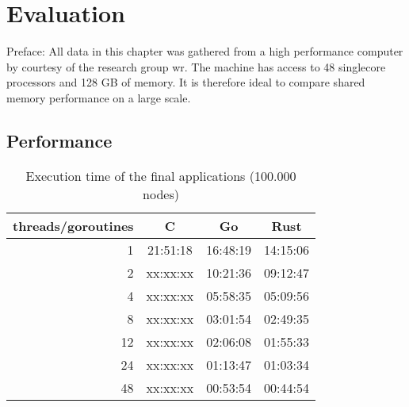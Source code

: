\chapter{Evaluation}
\label{ch:Evaluation}


Preface: All data in this chapter was gathered from a high performance computer by courtesy of the research group \gls{wr}. The machine has access to 48 singlecore processors and 128 GB of memory. It is therefore ideal to compare shared memory performance on a large scale.

\section{Performance}
\label{sec:Evaluaton::Performance}

\begin{table}[htb]
    \centering
    \begin{tabular}{rccc}
        \toprule
            threads/goroutines
            & C
            & Go
            & Rust \\
        \midrule

            1
            & 21:51:18
            & 16:48:19
            & 14:15:06 \\

            2
            & xx:xx:xx
            & 10:21:36
            & 09:12:47 \\

            4
            & xx:xx:xx
            & 05:58:35
            & 05:09:56 \\

            8
            & xx:xx:xx
            & 03:01:54
            & 02:49:35 \\

            12
            & xx:xx:xx
            & 02:06:08
            & 01:55:33 \\

            24
            & xx:xx:xx
            & 01:13:47
            & 01:03:34 \\

            48
            & xx:xx:xx
            & 00:53:54
            & 00:44:54 \\

        \bottomrule
    \end{tabular}
    \caption{Execution time of the final applications (100.000 nodes)}
    \label{tb:final_execution_time}
\end{table}

